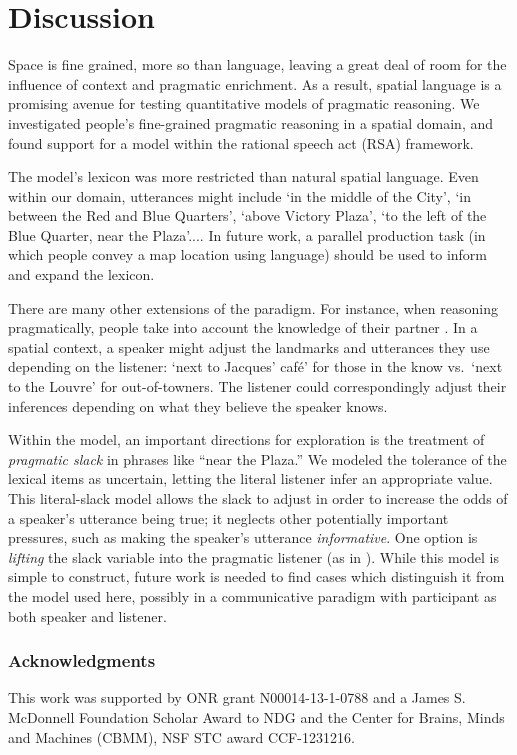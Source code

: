 \documentclass[10pt,letterpaper]{article}
\newcommand{\ndg}[1]{\textcolor{Green}{[ndg: #1]}}
\begin{document}
\section{Discussion}

Space is fine grained, more so than language, leaving a great deal of room for the influence of context and pragmatic enrichment. As a result, spatial language is a promising avenue for testing quantitative models of pragmatic reasoning. We investigated people's fine-grained pragmatic reasoning in a spatial domain, and found support for a model within the rational speech act (RSA) framework.  

The model's lexicon was more restricted than natural spatial language. Even within our domain, utterances might include `in the middle of the City', `in between the Red and Blue Quarters', `above Victory Plaza', `to the left of the Blue Quarter, near the Plaza'.... In future work, a parallel production task (in which people convey a map location using language) should be used to inform and expand the lexicon. 

There are many other extensions of the paradigm. For instance, when reasoning pragmatically, people take into account the knowledge of their partner \cite{ndg+ast:topics2013}. In a spatial context, a speaker might adjust the landmarks and utterances they use depending on the listener: `next to Jacques' caf\'{e}' for those in the know vs.~`next to the Louvre' for out-of-towners. The listener could correspondingly adjust their inferences depending on what they believe the speaker knows.

Within the model, an important directions for exploration is the treatment of \emph{pragmatic slack} in phrases like ``near the Plaza.'' We modeled the tolerance of the lexical items as uncertain, letting the literal listener  infer an appropriate value. This literal-slack model allows the slack to adjust in order to increase the odds of a speaker's utterance being true; it neglects other potentially important pressures, such as making the speaker's utterance \emph{informative}. 
One option is \emph{lifting} the slack variable into the pragmatic listener (as in ). While this model is simple to construct, future work is needed to find cases which distinguish it from the model used here, possibly in a communicative paradigm with participant as both speaker and listener. 

\subsubsection{Acknowledgments}
\small
This work was supported by ONR grant N00014-13-1-0788 and a James S. McDonnell Foundation Scholar Award to NDG and the Center for Brains, Minds and Machines (CBMM), NSF STC award CCF-1231216. 


\setlength{\bibleftmargin}{.125in}
\setlength{\bibindent}{-\bibleftmargin}

\end{document}
